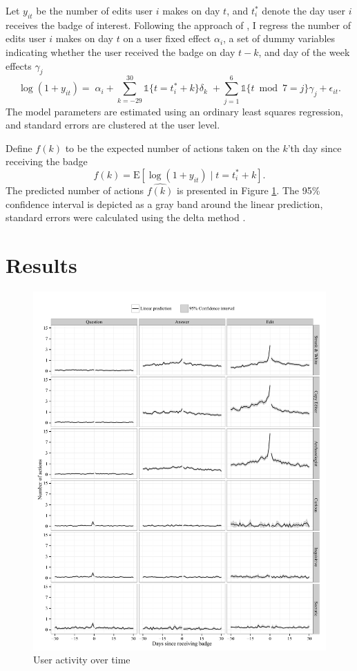 \documentclass{article}
\newcommand{\1}{\mathds{1}}
\newcommand{\E}{\mathrm{E}}
\begin{document}
Let $y_{it}$ be the number of edits user $i$ makes on day $t$, and $t_i^*$ denote the day user $i$ receives the badge of interest. Following the approach of \citet{Jacobson1993}, I regress the number of edits user $i$ makes on day $t$ on a user fixed effect $\alpha_i$, a set of dummy variables indicating whether the user received the badge on day $t-k$, and day of the week effects $\gamma_j$
\begin{equation}
\log(1 + y_{it}) = \; \alpha_i + \sum_{k=-29}^{30} \1 \{ t = t_i^* + k \} \delta_k \; + \sum_{j=1}^6 \1 \{ t \bmod 7 = j \} \gamma_j + \epsilon_{it}.
\end{equation}
The model parameters are estimated using an ordinary least squares regression, and standard errors are clustered at the user level.

Define $f(k)$ to be the expected number of actions taken on the $k$'th day since receiving the badge
\begin{equation}
f(k) = \E \left[ \log(1 + y_{it}) \; | \; t=t^*_i + k \right].
\end{equation}
The predicted number of actions $\hat{f(k)}$ is presented in Figure \ref{fig:badges}. The 95\% confidence interval is depicted as a gray band around the linear prediction, standard errors were calculated using the delta method \citep{Williams2012}.

\section{Results}

\begin{figure}
  \centering
  \includegraphics[width=\textwidth]{../figures/badges.pdf}
  \caption{User activity over time \label{fig:badges}}
\end{figure}
\end{document}
